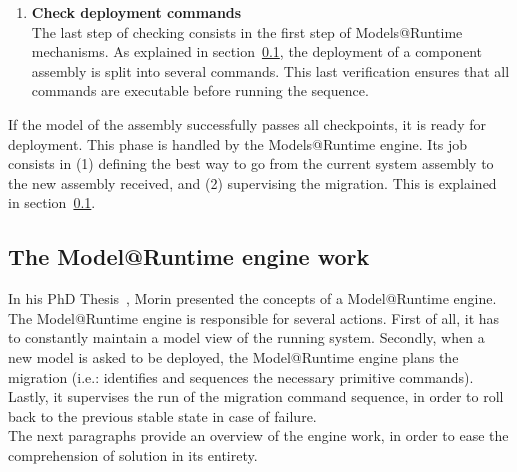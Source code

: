 \begin{enumerate}
\item {\bf Check deployment commands}\\
The last step of checking consists in the first step of Models@Runtime mechanisms. As explained in section~\ref{subsec:modelatruntime}, the deployment of a component assembly is split into several commands. This last verification ensures that all commands are executable before running the sequence.

\end{enumerate}

If the model of the assembly successfully passes all checkpoints, it is ready for deployment. This phase is handled by the Models@Runtime engine. Its job consists in (1) defining the best way to go from the current system assembly to the new assembly received, and (2) supervising the migration. This is explained in section~\ref{subsec:modelatruntime}.




\subsection{The Model@Runtime engine work}
\label{subsec:modelatruntime}
In his PhD Thesis~\cite{Morin:2010}, Morin presented the concepts of a Model@Runtime engine. The Model@Runtime engine is responsible for several actions. First of all, it has to constantly maintain a model view of the running system. Secondly, when a new model is asked to be deployed, the Model@Runtime engine plans the migration (i.e.: identifies and sequences the necessary primitive commands). Lastly, it supervises the run of the migration command sequence, in order to roll back to the previous stable state in case of failure.\\
The next paragraphs provide an overview of the engine work, in order to ease the comprehension of solution in its entirety.\\

